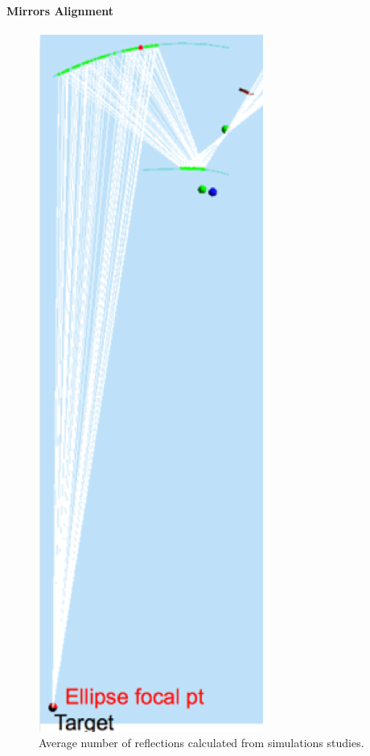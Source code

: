 \paragraph{Mirrors Alignment}



\begin{figure}[hbt]
\centering
	\includegraphics[width=1.0\columnwidth, height=0.5\textheight]{img/mirrorAlignmentSimulation.png}
	\caption{Average number of reflections calculated from simulations studies.}
	\label{fig:reflectivityGain}
\end{figure}
